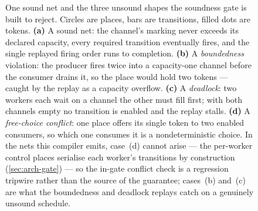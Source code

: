 \begin{figure}[tbp]
{}
  \caption[The sound case and the three the gate rejects]{One sound net and the
    three unsound shapes the soundness gate is built to reject. Circles are
    places, bars are transitions, filled dots are tokens. \textbf{(a)} A sound
    net: the channel's marking never exceeds its declared capacity, every
    required transition eventually fires, and the single replayed firing order
    runs to completion. \textbf{(b)} A \emph{boundedness} violation: the producer
    fires twice into a capacity-one channel before the consumer drains it, so the
    place would hold two tokens --- caught by the replay as a capacity overflow.
    \textbf{(c)} A \emph{deadlock}: two workers each wait on a channel the other
    must fill first; with both channels empty no transition is enabled and the
    replay stalls. \textbf{(d)} A \emph{free-choice conflict}: one place offers its
    single token to two enabled consumers, so which one consumes it is a
    nondeterministic choice. In the nets this compiler emits, case~(d) cannot
    arise --- the per-worker control places serialise each worker's transitions by
    construction (\cref{sec:arch-gate}) --- so the in-gate conflict check is a
    regression tripwire rather than the source of the guarantee; cases~(b)
    and~(c) are what the boundedness and deadlock replays catch on a genuinely
    unsound schedule.}
  \label{fig:petri-gate}
\end{figure}
